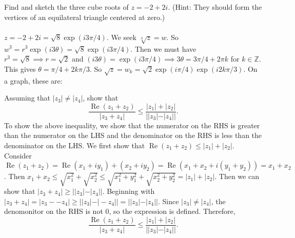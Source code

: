 \documentclass[11pt]{exam}
\newcommand{\Z}{\mathbb{Z}}
\DeclareMathOperator{\re}{Re}
\begin{document}
\begin{questions}
\question Find and sketch the three cube roots of $z=-2+2i$. (Hint:
They should form the vertices of an equilateral triangle centered at
zero.) \\\\
$z = -2 + 2i = \sqrt{8} \exp (i3\pi /4)$.
We seek $\sqrt[3]{z} = w$.
So $w^3 = r^3 \exp (i3\theta) = \sqrt{8} \exp (i3\pi /4)$.
Then we must have $r^3 = \sqrt{8} \implies r = \sqrt{2}$ and $(i3\theta) = \exp (i3\pi /4) \implies 3\theta = 3\pi /4 + 2\pi k$ for $k \in \Z$.
This gives $\theta  = \pi /4 + 2k\pi /3 $.
So $\sqrt{z} = w_k = \sqrt{2} \exp(i\pi /4) \exp (i2k\pi /3)$.
On a graph, these are:

\begin{center}
\end{center}

\question Assuming that $|z_3| \ne |z_4|$, show that
\[
  \frac{ \re(z_1+z_2)}{|z_3+z_4|} \le \frac{|z_1| +
    |z_2|}{||z_3|-|z_4||}.
\]
To show the above inequality, we show that the numerator on the RHS is greater than the numerator on the LHS and the denominator on the RHS is less than the denominator on the LHS.
We first show that $\re (z_1 + z_2) \leq |z_1| + |z_2|$.
Consider $\re (z_1 + z_2) = \re (x_1 + iy_1) + (x_2 + iy_2) = \re (x_1 + x_2 + i(y_1 + y_2)) = x_1 + x_2$.
Then $x_1 + x_2 \leq \sqrt{x_1^2} + \sqrt{x_2^2} \leq \sqrt{x_1^2 + y_1^2} + \sqrt{x_2^2 + y_2^2} = |z_1| + |z_2|$.
Then we can show that $|z_3 + z_4| \geq ||z_3| - |z_4||$.
Beginning with $|z_3 + z_4| = |z_3 - -z_4| \geq ||z_3| - |-z_4|| = ||z_3| - |z_4||$.
Since $|z_3| \ne |z_4|$, the denomonitor on the RHS is not 0, so the expression is defined.
Therefore,
\[
  \frac{ \re(z_1+z_2)}{|z_3+z_4|} \le \frac{|z_1| +
    |z_2|}{||z_3|-|z_4||}.
\]


\end{questions}
\end{document}

